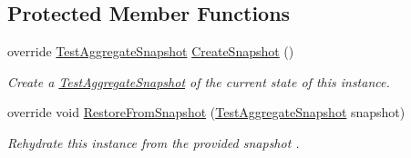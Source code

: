 \subsection*{Protected Member Functions}
\begin{DoxyCompactItemize}
\item 
override \hyperlink{classCqrs_1_1MongoDB_1_1Tests_1_1Integration_1_1MongoDbSnapshotStoreTests_1_1TestAggregateSnapshot}{Test\+Aggregate\+Snapshot} \hyperlink{classCqrs_1_1MongoDB_1_1Tests_1_1Integration_1_1MongoDbSnapshotStoreTests_1_1TestAggregate_a1a38ed933432bc5ab1bf4b0b5ed51caa_a1a38ed933432bc5ab1bf4b0b5ed51caa}{Create\+Snapshot} ()
\begin{DoxyCompactList}\small\item\em Create a \hyperlink{classCqrs_1_1MongoDB_1_1Tests_1_1Integration_1_1MongoDbSnapshotStoreTests_1_1TestAggregateSnapshot}{Test\+Aggregate\+Snapshot} of the current state of this instance. \end{DoxyCompactList}\item 
override void \hyperlink{classCqrs_1_1MongoDB_1_1Tests_1_1Integration_1_1MongoDbSnapshotStoreTests_1_1TestAggregate_aa1d4be82ca1c195882f36578a551dfb2_aa1d4be82ca1c195882f36578a551dfb2}{Restore\+From\+Snapshot} (\hyperlink{classCqrs_1_1MongoDB_1_1Tests_1_1Integration_1_1MongoDbSnapshotStoreTests_1_1TestAggregateSnapshot}{Test\+Aggregate\+Snapshot} snapshot)
\begin{DoxyCompactList}\small\item\em Rehydrate this instance from the provided {\itshape snapshot} . \end{DoxyCompactList}\end{DoxyCompactItemize}
